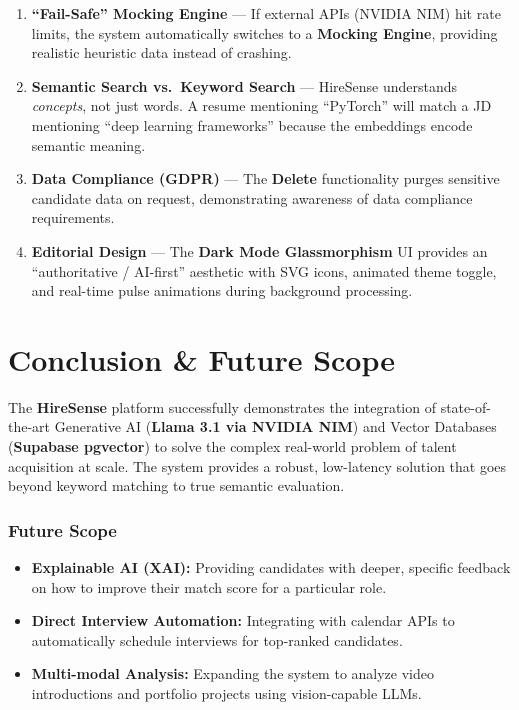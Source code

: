 \documentclass[12pt, a4paper]{article}
\newcommand{\highlight}[1]{\textcolor{primary}{\textbf{#1}}}
\begin{document}
\begin{enumerate}[noitemsep, leftmargin=*, label=\textbf{\arabic*.}]

    \item \highlight{``Fail-Safe'' Mocking Engine} --- If external APIs (NVIDIA NIM) hit rate limits, the system automatically switches to a \textbf{Mocking Engine}, providing realistic heuristic data instead of crashing.

    \item \highlight{Semantic Search vs.\ Keyword Search} --- HireSense understands \emph{concepts}, not just words. A resume mentioning ``PyTorch'' will match a JD mentioning ``deep learning frameworks'' because the embeddings encode semantic meaning.

    \item \highlight{Data Compliance (GDPR)} --- The \textbf{Delete} functionality purges sensitive candidate data on request, demonstrating awareness of data compliance requirements.

    \item \highlight{Editorial Design} --- The \textbf{Dark Mode Glassmorphism} UI provides an ``authoritative / AI-first'' aesthetic with SVG icons, animated theme toggle, and real-time pulse animations during background processing.

\end{enumerate}

\section{Conclusion \& Future Scope}

The \textbf{HireSense} platform successfully demonstrates the integration of state-of-the-art Generative AI (\textbf{Llama 3.1 via NVIDIA NIM}) and Vector Databases (\textbf{Supabase pgvector}) to solve the complex real-world problem of talent acquisition at scale. The system provides a robust, low-latency solution that goes beyond keyword matching to true semantic evaluation.

\subsubsection*{Future Scope}
\begin{itemize}[noitemsep]
    \item \textbf{Explainable AI (XAI):} Providing candidates with deeper, specific feedback on how to improve their match score for a particular role.
    \item \textbf{Direct Interview Automation:} Integrating with calendar APIs to automatically schedule interviews for top-ranked candidates.
    \item \textbf{Multi-modal Analysis:} Expanding the system to analyze video introductions and portfolio projects using vision-capable LLMs.
\end{itemize}
\end{document}
